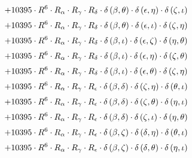\begin{subequations}
\begin{gather}
 \\[0.2em] \notag 		 + 10395 \cdot R^{6} \cdot R_{\alpha{}} \cdot R_{\gamma{}} \cdot R_{\delta{}} \cdot \delta{}\left(\beta{}, \theta{}\right) \cdot \delta{}\left(\epsilon{}, \eta{}\right) \cdot \delta{}\left(\zeta{}, \iota{}\right) 
 \\[0.2em] \notag 		 + 10395 \cdot R^{6} \cdot R_{\alpha{}} \cdot R_{\gamma{}} \cdot R_{\delta{}} \cdot \delta{}\left(\beta{}, \theta{}\right) \cdot \delta{}\left(\epsilon{}, \iota{}\right) \cdot \delta{}\left(\zeta{}, \eta{}\right) 
 \\[0.2em] \notag 		 + 10395 \cdot R^{6} \cdot R_{\alpha{}} \cdot R_{\gamma{}} \cdot R_{\delta{}} \cdot \delta{}\left(\beta{}, \iota{}\right) \cdot \delta{}\left(\epsilon{}, \zeta{}\right) \cdot \delta{}\left(\eta{}, \theta{}\right) 
 \\[0.2em] \notag 		 + 10395 \cdot R^{6} \cdot R_{\alpha{}} \cdot R_{\gamma{}} \cdot R_{\delta{}} \cdot \delta{}\left(\beta{}, \iota{}\right) \cdot \delta{}\left(\epsilon{}, \eta{}\right) \cdot \delta{}\left(\zeta{}, \theta{}\right) 
 \\[0.2em] \notag 		 + 10395 \cdot R^{6} \cdot R_{\alpha{}} \cdot R_{\gamma{}} \cdot R_{\delta{}} \cdot \delta{}\left(\beta{}, \iota{}\right) \cdot \delta{}\left(\epsilon{}, \theta{}\right) \cdot \delta{}\left(\zeta{}, \eta{}\right) 
 \\[0.2em] \notag 		 + 10395 \cdot R^{6} \cdot R_{\alpha{}} \cdot R_{\gamma{}} \cdot R_{\epsilon{}} \cdot \delta{}\left(\beta{}, \delta{}\right) \cdot \delta{}\left(\zeta{}, \eta{}\right) \cdot \delta{}\left(\theta{}, \iota{}\right) 
 \\[0.2em] \notag 		 + 10395 \cdot R^{6} \cdot R_{\alpha{}} \cdot R_{\gamma{}} \cdot R_{\epsilon{}} \cdot \delta{}\left(\beta{}, \delta{}\right) \cdot \delta{}\left(\zeta{}, \theta{}\right) \cdot \delta{}\left(\eta{}, \iota{}\right) 
 \\[0.2em] \notag 		 + 10395 \cdot R^{6} \cdot R_{\alpha{}} \cdot R_{\gamma{}} \cdot R_{\epsilon{}} \cdot \delta{}\left(\beta{}, \delta{}\right) \cdot \delta{}\left(\zeta{}, \iota{}\right) \cdot \delta{}\left(\eta{}, \theta{}\right) 
 \\[0.2em] \notag 		 + 10395 \cdot R^{6} \cdot R_{\alpha{}} \cdot R_{\gamma{}} \cdot R_{\epsilon{}} \cdot \delta{}\left(\beta{}, \zeta{}\right) \cdot \delta{}\left(\delta{}, \eta{}\right) \cdot \delta{}\left(\theta{}, \iota{}\right) 
 \\[0.2em] \notag 		 + 10395 \cdot R^{6} \cdot R_{\alpha{}} \cdot R_{\gamma{}} \cdot R_{\epsilon{}} \cdot \delta{}\left(\beta{}, \zeta{}\right) \cdot \delta{}\left(\delta{}, \theta{}\right) \cdot \delta{}\left(\eta{}, \iota{}\right) 

\end{gather}
\end{subequations}
